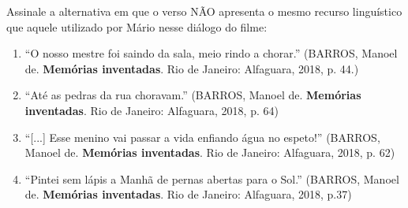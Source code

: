 Assinale a alternativa em que o verso NÃO apresenta o mesmo recurso linguístico que aquele utilizado por Mário nesse diálogo do filme:\begin{enumerate}
\item “O nosso mestre foi saindo da sala, meio rindo a chorar.” (BARROS, Manoel de. \textbf{Memórias inventadas}. Rio de Janeiro:
      Alfaguara, 2018, p. 44.)
\item “Até as pedras da rua choravam.” (BARROS, Manoel de. \textbf{Memórias inventadas}. Rio de Janeiro: Alfaguara, 2018, p. 64)
\item “[...] Esse menino vai passar a vida enfiando água no espeto!” (BARROS, Manoel de. \textbf{Memórias inventadas}. Rio de Janeiro:
      Alfaguara, 2018, p. 62)
\item “Pintei sem lápis a Manhã de pernas abertas para o Sol.” (BARROS, Manoel de. \textbf{Memórias inventadas}. Rio de Janeiro:
      Alfaguara, 2018, p.37)\end{enumerate}
